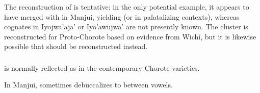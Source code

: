 \begin{exe}
    \ex {}
    \ex {}
\end{exe}

The reconstruction of  is tentative: in the only potential example, it appears to have merged with  in Manjui, yielding  (or  in palatalizing contexts), whereas cognates in Iyojwa’aja’ or Iyo’awujwa’ are not presently known. The cluster is reconstructed for Proto-Chorote based on evidence from Wichí, but it is likewise possible that  should be reconstructed instead.

\begin{exe}
    \ex {}
\end{exe}

\subsubsection{}\label{ch-q'}

 is normally reflected as  in the contemporary Chorote varieties.

\begin{exe}
    \ex {}
    \ex {}
\end{exe}

In Manjui,  sometimes debuccalizes to  between vowels.

\begin{exe}
    \ex {}
    \ex {}
\end{exe}

\subsubsection{}\label{ch-k'}

